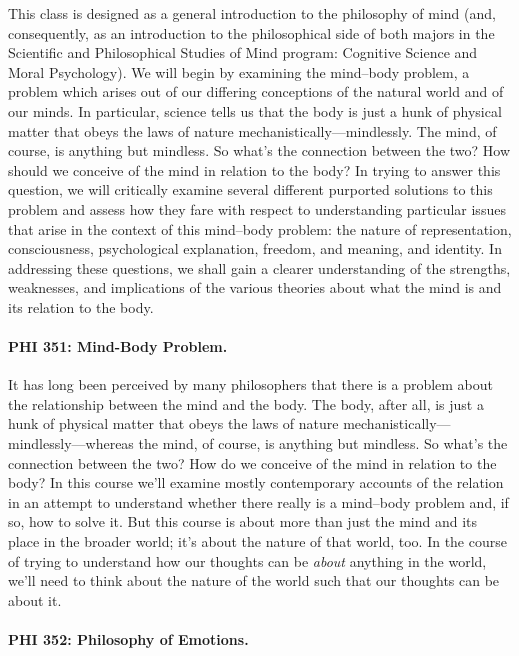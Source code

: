 \documentclass[%
  11pt,%
]{article}
\let\oldparagraph\paragraph
\renewcommand\paragraph[1]{\oldparagraph{\textcolor{myblue}{#1}}}
\begin{document}
This class is designed as a general introduction to the philosophy of mind (and, consequently, as an introduction to the philosophical side of both majors in the Scientific and Philosophical Studies of Mind program: Cognitive Science and Moral Psychology). We will begin by examining the mind--body problem, a problem which arises out of our differing conceptions of the natural world and of our minds. In particular, science tells us that the body is just a hunk of physical matter that obeys the laws of nature mechanistically---mindlessly. The mind, of course, is anything but mindless. So what's the connection between the two? How should we conceive of the mind in relation to the body? In trying to answer this question, we will critically examine several different purported solutions to this problem and assess how they fare with respect to understanding particular issues that arise in the context of this mind--body problem: the nature of representation, consciousness, psychological explanation, freedom, and meaning, and identity. In addressing these questions, we shall gain a clearer understanding of the strengths, weaknesses, and implications of the various theories about what the mind is and its relation to the body.

\paragraph{PHI 351: Mind-Body Problem.}

It has long been perceived by many philosophers that there is a problem about the relationship between the mind and the body. The body, after all, is just a hunk of physical matter that obeys the laws of nature mechanistically---mindlessly---whereas the mind, of course, is anything but mindless. So what's the connection between the two? How do we conceive of the mind in relation to the body? In this course we'll examine mostly contemporary accounts of the relation in an attempt to understand whether there really is a mind--body problem and, if so, how to solve it. But this course is about more than just the mind and its place in the broader world; it's about the nature of that world, too. In the course of trying to understand how our thoughts can be \emph{about} anything in the world, we'll need to think about the nature of the world such that our thoughts can be about it.

\paragraph{PHI 352: Philosophy of Emotions.}
\end{document}
